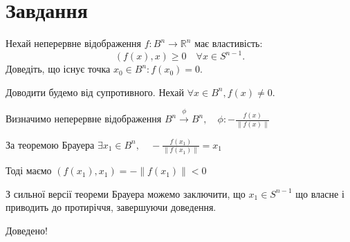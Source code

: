 
\chapter{Завдання \theHchapter}

\begin{tcolorbox}[title=Завдання]
    Нехай неперервне відображення $f: B^{n} \rightarrow \mathbb{R}^{n}$ має властивість:
    $$(f(x), x) \geq 0 \quad \forall x \in S^{n-1} .$$
    Доведіть, що існує точка $x_{0} \in B^{n}: f\left(x_{0}\right)=0$.

\end{tcolorbox}


Доводити будемо від супротивного. Нехай 
$\forall x \in B^n, f(x) \neq 0 $.


Визначимо неперервне відображення $B^n \xrightarrow{\phi} B^n, \quad
\phi: - \frac{f(x)}{\|f(x)\|}$


За теоремою Брауера $\exists x_1 \in B^n, \quad
-\frac{f(x_1)}{\|f(x_1)\|} = x_1$


Тоді маємо $(f(x_1), x_1) = -\|f(x_1)\| < 0$


З сильної версії теореми Брауера можемо заключити, що $x_1 \in S^{n - 1}$
що власне і приводить до протиріччя, завершуючи доведення.


Доведено!
